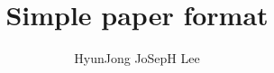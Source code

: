 \documentclass{sig-alternate}
\begin{document}
\title{Simple paper format}

\author[*]{HyunJong JoSepH Lee}
\renewcommand\Authands{ and }

\maketitle











{\footnotesize{
    
}}



\balancecolumns
\end{document}
